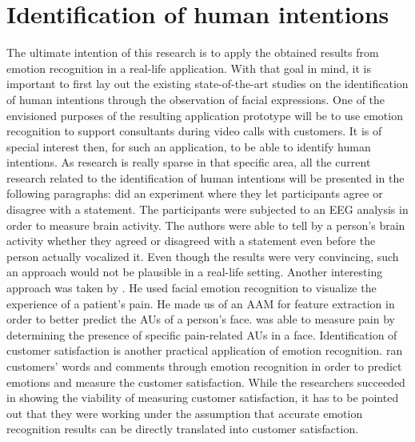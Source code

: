 \section{Identification of human intentions}
The ultimate intention of this research is to apply the obtained results from emotion recognition in a real-life application. With that goal in mind, it is important to first lay out the existing state-of-the-art studies on the identification of human intentions through the observation of facial expressions. One of the envisioned purposes of the resulting application prototype will be to use emotion recognition to support consultants during video calls with customers.
\newline\newline
It is of special interest then, for such an application, to be able to identify human intentions. As research is really sparse in that specific area, all the current research related to the identification of human intentions will be presented in the following paragraphs:
\newline\newline
\citet{Dong:2012:UnderstandHumanImplicitIntention} did an experiment where they let participants agree or disagree with a statement. The participants were subjected to an \gls{EEG} analysis in order to measure brain activity. The authors were able to tell by a person’s brain activity whether they agreed or disagreed with a statement even before the person actually vocalized it. Even though the results were very convincing, such an approach would not  be plausible in a real-life setting.
\newline\newline
Another interesting approach was taken by \citet{Esser:2018:LandmarkDetection}. He used facial emotion recognition to visualize the experience of a patient's pain. He made us of an \gls{AAM} for feature extraction in order to better predict the AUs of a person's face. \citeauthor{Esser:2018:LandmarkDetection} was able to measure pain by determining the presence of specific pain-related AUs in a face.
\newline\newline
Identification of customer satisfaction is another practical application of emotion recognition. \citet{Ren:2012:ERforCustomerSatisfaction} ran customers' words and comments through emotion recognition in order to predict emotions and measure the customer satisfaction. While the researchers succeeded in showing the viability of measuring customer satisfaction, it has to be pointed out that they were working under the assumption that accurate emotion recognition results can be directly translated into customer satisfaction.
